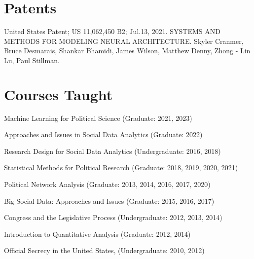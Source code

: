 \documentclass[overlapped,line]{res}
\begin{document}
\begin{resume}
\section{\bf Patents}
\begin{etaremune}
\item United States Patent; US 11,062,450 B2; Jul.13, 2021. SYSTEMS AND METHODS FOR MODELING
NEURAL ARCHITECTURE.  Skyler Cranmer, Bruce Desmarais,  Shankar Bhamidi, James Wilson,  Matthew Denny,  Zhong - Lin Lu, Paul Stillman. 
\end{etaremune}

\section{\bf Courses Taught}
\begin{etaremune}
\item Machine Learning for Political Science (Graduate: 2021, 2023)
\item Approaches and Issues in Social Data Analytics (Graduate: 2022)
\item Research Design for Social Data Analytics (Undergraduate: 2016, 2018)
\item Statistical Methods for Political Research (Graduate: 2018, 2019, 2020, 2021)
\item Political Network Analysis (Graduate: 2013, 2014, 2016, 2017, 2020)
\item Big Social Data: Approaches and Issues (Graduate: 2015, 2016, 2017)
\item Congress and the Legislative Process (Undergraduate: 2012, 2013, 2014)
\item Introduction to Quantitative Analysis (Graduate: 2012, 2014)
\item Official Secrecy in the United States, (Undergraduate: 2010, 2012) 
\end{etaremune}





\end{resume}
\end{document}
